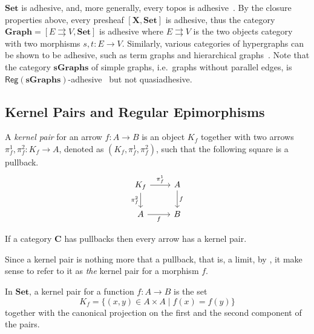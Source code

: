 \documentclass[runningheads,envcountsect]{llncs}
\newcommand{\cat}[1]{\ensuremath{\mathbf{#1}}}
\newcommand{\Set}{\mathbf{Set}}
\newcommand{\reg}{\mathsf{Reg}}
\begin{document}
\begin{example}
	\label{ex:adhesive}
	$\cat{Set}$ is adhesive, and, more generally, every topos is
	adhesive~\cite{lack2006toposes}. By the closure properties above, every presheaf $[\cat{X},\cat{Set}]$ is adhesive, thus the category
	$\cat{Graph} = [ E \rightrightarrows V, \cat{Set}]$ is adhesive
	where $E \rightrightarrows {V}$ is the two objects category with two
	morphisms $s,t \colon{E} \to {V}$. Similarly, various
	categories of hypergraphs can be shown to be adhesive, such as term
	graphs and hierarchical graphs~\cite{CastelnovoGM24}. Note that the category $\cat{sGraphs}$ of simple graphs, 
	i.e.~graphs without parallel edges, is
	$\reg{(\cat{sGraphs})}$-adhesive~\cite{BehrHK23} but not
	quasiadhesive.
\end{example}


\subsection{Kernel Pairs and Regular Epimorphisms}

\begin{definition}
    A \emph{kernel pair} for an arrow $f: A \to B$ is an object $K_f$ together with two arrows $\pi^1_f, \pi^2_f : K_f \to A$, denoted as $(K_f, \pi^1_f, \pi^2_f)$, such that the following square is a pullback.
    \[
        \begin{tikzcd}
            K_f \ar[r, "{\pi^1_f}"] \ar[d, "{\pi^2_f}" swap] & A \arrow[d, "f"] \\
            A \ar[r, "f"swap] & B
        \end{tikzcd}
    \]
\end{definition}

\begin{remark}
	If a category $\cat{C}$ has pullbacks then every arrow has a kernel pair.
\end{remark}

\begin{remark}
    Since a kernel pair is nothing more that a pullback, that is, a limit, by , it make sense to refer to it as \emph{the} kernel pair for a morphism $f$.
\end{remark}

\begin{example}\label{ex:kernel_pairs_in_Set}
    In $\Set$, a kernel pair for a function $f: A\to B$ is the set
    \[
        K_f=\{(x, y) \in A \times A \mid f(x) = f(y)\}
    \]
    together with the canonical projection on the first and the second component of the pairs.
\end{example}
\end{document}
